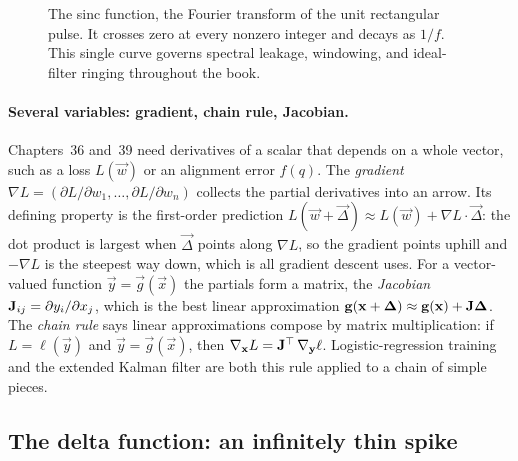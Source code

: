 \begin{figure}[H]
\centering
{}
\caption{The sinc function, the Fourier transform of the unit rectangular pulse. It crosses zero
at every nonzero integer and decays as $1/f$. This single curve governs spectral leakage,
windowing, and ideal-filter ringing throughout the book.}
\label{ch42:fig-sinc}
\end{figure}

\paragraph{Several variables: gradient, chain rule, Jacobian.} Chapters~36 and~39 need
derivatives of a scalar that depends on a whole vector, such as a loss $L(\vec{w})$ or an
alignment error $f(q)$. The \emph{gradient} $\nabla L = (\partial L/\partial w_1, \dots,
\partial L/\partial w_n)$ collects the partial derivatives into an arrow. Its defining
property is the first-order prediction
$L(\vec{w} + \vec{\Delta}) \approx L(\vec{w}) + \nabla L\cdot\vec{\Delta}$: the dot product is
largest when $\vec{\Delta}$ points along $\nabla L$, so the gradient points uphill
and $-\nabla L$ is the steepest way down, which is all gradient descent uses. For a
vector-valued function $\vec{y} = \vec{g}(\vec{x})$ the partials form a matrix, the
\emph{Jacobian} $\mathbf{J}_{ij} = \partial y_i/\partial x_j$, which is the best linear
approximation $\mathbf{g}(\mathbf{x}+\mathbf{\Delta}) \approx \mathbf{g}(\mathbf{x}) + \mathbf{J}\mathbf{\Delta}$. The
\emph{chain rule} says linear approximations compose by matrix multiplication: if
$L = \ell(\vec{y})$ and $\vec{y} = \vec{g}(\vec{x})$, then
$\nabla_{\mathbf{x}} L = \mathbf{J}^\top\,\nabla_{\mathbf{y}}\ell$. Logistic-regression training and
the extended Kalman filter are both this rule applied to a chain of simple pieces.

\subsection{The delta function: an infinitely thin spike}

